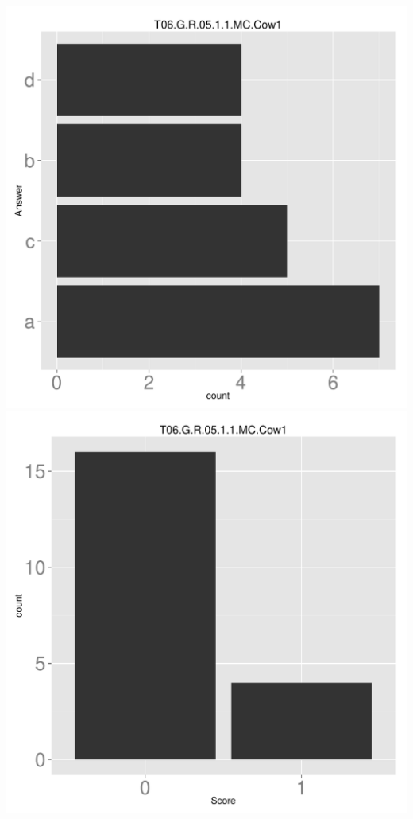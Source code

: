 \documentclass[12pt,nohyper]{tufte-handout}\usepackage[]{graphicx}\usepackage[]{color}
\begin{document}
\begin{center} \includegraphics[width=.45\linewidth]{Topic06_74_answer} \includegraphics[width=.45\linewidth]{Topic06_74_score} \end{center} 
\end{document}

